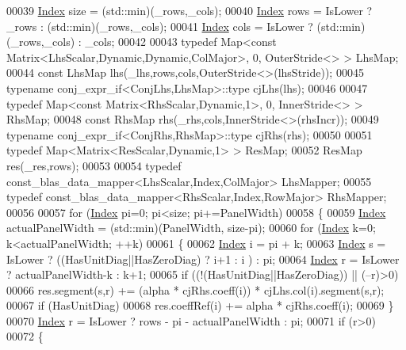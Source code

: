 \begin{DoxyCode}
00039     \hyperlink{namespace_eigen_a62e77e0933482dafde8fe197d9a2cfde}{Index} size = (std::min)(\_rows,\_cols);
00040     \hyperlink{namespace_eigen_a62e77e0933482dafde8fe197d9a2cfde}{Index} rows = IsLower ? \_rows : (std::min)(\_rows,\_cols);
00041     \hyperlink{namespace_eigen_a62e77e0933482dafde8fe197d9a2cfde}{Index} cols = IsLower ? (std::min)(\_rows,\_cols) : \_cols;
00042 
00043     \textcolor{keyword}{typedef} Map<const Matrix<LhsScalar,Dynamic,Dynamic,ColMajor>, 0, OuterStride<> > LhsMap;
00044     \textcolor{keyword}{const} LhsMap lhs(\_lhs,rows,cols,OuterStride<>(lhsStride));
00045     \textcolor{keyword}{typename} conj\_expr\_if<ConjLhs,LhsMap>::type cjLhs(lhs);
00046 
00047     \textcolor{keyword}{typedef} Map<const Matrix<RhsScalar,Dynamic,1>, 0, InnerStride<> > RhsMap;
00048     \textcolor{keyword}{const} RhsMap rhs(\_rhs,cols,InnerStride<>(rhsIncr));
00049     \textcolor{keyword}{typename} conj\_expr\_if<ConjRhs,RhsMap>::type cjRhs(rhs);
00050 
00051     \textcolor{keyword}{typedef} Map<Matrix<ResScalar,Dynamic,1> > ResMap;
00052     ResMap res(\_res,rows);
00053 
00054     \textcolor{keyword}{typedef} const\_blas\_data\_mapper<LhsScalar,Index,ColMajor> LhsMapper;
00055     \textcolor{keyword}{typedef} const\_blas\_data\_mapper<RhsScalar,Index,RowMajor> RhsMapper;
00056 
00057     \textcolor{keywordflow}{for} (\hyperlink{namespace_eigen_a62e77e0933482dafde8fe197d9a2cfde}{Index} pi=0; pi<size; pi+=PanelWidth)
00058     \{
00059       \hyperlink{namespace_eigen_a62e77e0933482dafde8fe197d9a2cfde}{Index} actualPanelWidth = (std::min)(PanelWidth, size-pi);
00060       \textcolor{keywordflow}{for} (\hyperlink{namespace_eigen_a62e77e0933482dafde8fe197d9a2cfde}{Index} k=0; k<actualPanelWidth; ++k)
00061       \{
00062         \hyperlink{namespace_eigen_a62e77e0933482dafde8fe197d9a2cfde}{Index} i = pi + k;
00063         \hyperlink{namespace_eigen_a62e77e0933482dafde8fe197d9a2cfde}{Index} s = IsLower ? ((HasUnitDiag||HasZeroDiag) ? i+1 : i ) : pi;
00064         \hyperlink{namespace_eigen_a62e77e0933482dafde8fe197d9a2cfde}{Index} r = IsLower ? actualPanelWidth-k : k+1;
00065         \textcolor{keywordflow}{if} ((!(HasUnitDiag||HasZeroDiag)) || (--r)>0)
00066           res.segment(s,r) += (alpha * cjRhs.coeff(i)) * cjLhs.col(i).segment(s,r);
00067         \textcolor{keywordflow}{if} (HasUnitDiag)
00068           res.coeffRef(i) += alpha * cjRhs.coeff(i);
00069       \}
00070       \hyperlink{namespace_eigen_a62e77e0933482dafde8fe197d9a2cfde}{Index} r = IsLower ? rows - pi - actualPanelWidth : pi;
00071       \textcolor{keywordflow}{if} (r>0)
00072       \{

\end{DoxyCode}
